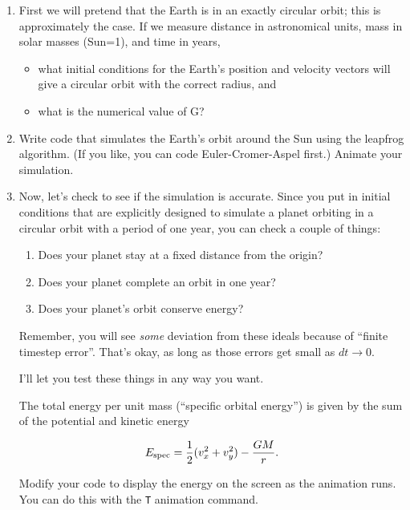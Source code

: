 \documentclass[12pt]{article}
\begin{document}
\begin{enumerate}
\item{First we will pretend that the Earth is in an exactly circular orbit;
this is approximately the case. If we measure distance in astronomical units,
mass in solar masses (Sun=1), and time in years,
\begin{itemize}
\item{what initial conditions for the Earth's position and velocity 
vectors will give a circular orbit with the correct radius, and}
\item{what is the numerical value of G?}
\end{itemize}

}

\item Write code that simulates the Earth's orbit around the Sun using the leapfrog algorithm. (If you like, you can code Euler-Cromer-Aspel first.) 
Animate your simulation.

\item{Now, let's check to see if the simulation is accurate. Since you put in initial conditions that are explicitly designed to simulate a planet orbiting in a circular
orbit with a period of one year, you can check a couple of things:

\begin{enumerate}
\item Does your planet stay at a fixed distance from the origin?
\item Does your planet complete an orbit in one year?
\item Does your planet's orbit conserve energy?
\end{enumerate}

Remember, you will see {\it some} deviation from these ideals because of ``finite timestep error''. That's okay, as long as those errors get small as $dt \rightarrow 0$.

I'll let you test these things in any way you want.

The total energy per unit mass (``specific orbital energy'') is given by the sum of the potential and kinetic energy

\begin{equation}
E_{\rm spec}=\frac{1}{2}(v_x^2+v_y^2) - \frac{GM}{r}.
\end{equation}

Modify your code to display the energy on the screen as the animation runs. You can do this with the {\tt T} animation command. 
}



\end{enumerate}
\end{document}
